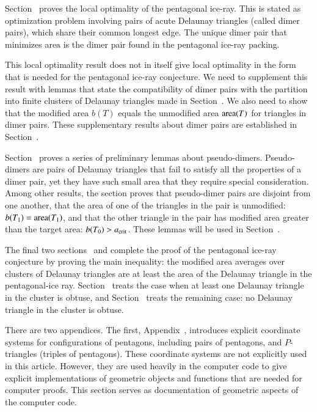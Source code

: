 Section~ proves the local optimality of the
pentagonal ice-ray.  This is stated as optimization problem involving
pairs of acute Delaunay triangles (called dimer pairs), which share
their common longest edge.  The unique dimer pair that minimizes area
is the dimer pair found in the pentagonal ice-ray packing.

This local optimality result does not in itself give local optimality
in the form that is needed for the pentagonal ice-ray conjecture.  We
need to supplement this result with lemmas that state the
compatibility of dimer pairs with the partition into finite clusters
of Delaunay triangles made in Section~.  We also need
to show that the modified area $b(T)$ equals the unmodified area
${\operatorname{area}}(T)$ for triangles in dimer pairs.  These supplementary
results about dimer pairs are established in
Section~.

Section~ proves a series of preliminary lemmas about
pseudo-dimers.  Pseudo-dimers are pairs of Delaunay triangles that
fail to satisfy all the properties of a dimer pair, yet they have such
small area that they require special consideration.  Among other
results, the section proves that pseudo-dimer pairs are disjoint from
one another, that the area of one of the triangles in the pair is
unmodified: $b(T_1)={\operatorname{area}}(T_1)$, and that the other triangle in the
pair has modified area greater than the target area: $b(T_0)>a_\text{crit}$.
These lemmas will be used in Section~.

The final two sections~ and 
complete the proof of the pentagonal ice-ray conjecture by proving the
main inequality: the modified area averages over clusters of Delaunay
triangles are at least the area of the Delaunay triangle in the
pentagonal-ice ray.  Section~ treats the case when at
least one Delaunay triangle in the cluster is obtuse, and
Section~ treats the remaining case: no Delaunay
triangle in the cluster is obtuse.

There are two appendices.  The first, Appendix~,
introduces explicit coordinate systems for configurations of
pentagons, including pairs of pentagons, and $P$-triangles (triples of
pentagons).  These coordinate systems are not explicitly used in this
article.  However, they are used heavily in the computer code to give
explicit implementations of geometric objects and functions that are
needed for computer proofs.  This section serves as
documentation of geometric aspects of the computer code.

